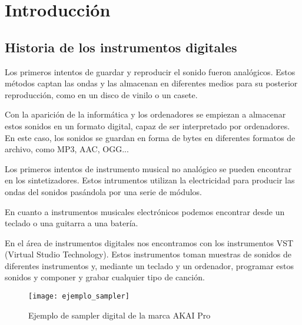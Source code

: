 
\chapter{Introducción} %
\label{cha:Introduccion}

    \section{Historia de los instrumentos digitales} %
    \label{sec:HistoriaDeLosInstrumentosDigitales}

        Los primeros intentos de guardar y reproducir el sonido fueron analógicos. Estos métodos captan las ondas y las
        almacenan en diferentes medios para su posterior reproducción, como en un disco de vinilo o un casete.

        Con la aparición de la informática y los ordenadores se empiezan a almacenar estos sonidos en un formato
        digital, capaz de ser interpretado por ordenadores. En este caso, los sonidos se guardan en forma de bytes en
        diferentes formatos de archivo, como MP3, AAC, OGG...

        Los primeros intentos de instrumento musical no analógico se pueden encontrar en los sintetizadores. Estos
        intrumentos utilizan la electricidad para producir las ondas del sonidos pasándola por una serie de módulos.

        En cuanto a instrumentos musicales electrónicos podemos encontrar desde un teclado o una guitarra a una batería.

        En el área de instrumentos digitales nos encontramos con los instrumentos VST (Virtual Studio Technology). Estos
        instrumentos toman muestras de sonidos de diferentes instrumentos y, mediante un teclado y un ordenador,
        programar estos sonidos y componer y grabar cualquier tipo de canción.\cite{historia_instrumentos_digitales}

        \begin{figure}[ht]
            \centering
            \texttt{[image: ejemplo\_sampler]}
            \caption{Ejemplo de sampler digital de la marca AKAI Pro\cite{akai_pro_imagen}\label{fig:EjemploSampler}}
        \end{figure}

